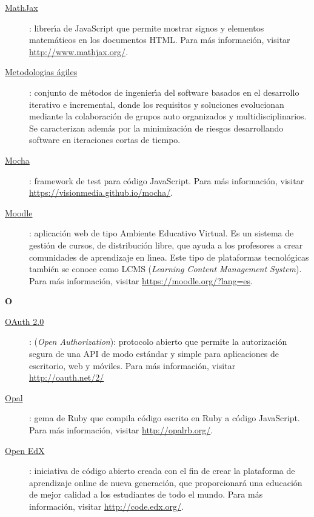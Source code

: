 \begin{description}
  \item[\underline{MathJax}\label{apend1:mathjax}]: librer\'{\i}a de JavaScript que permite mostrar signos y elementos matem\'aticos en los documentos HTML. Para m\'as informaci\'on, 
  visitar {\small \url{http://www.mathjax.org/}}.
  \bigskip

  \item[\underline{Metodologias \'agiles}\label{apend1:ma}]: conjunto de m\'etodos de ingenier\'{\i}a del software basados en el desarrollo iterativo e incremental, donde los requisitos y 
  soluciones evolucionan mediante la colaboraci\'on de grupos auto organizados y multidisciplinarios. Se caracterizan adem\'as por la minimizaci\'on de riesgos desarrollando software en
  iteraciones cortas de tiempo.
  \bigskip

  \item[\underline{Mocha}\label{apend1:mocha}]: framework de test para c\'odigo JavaScript. Para m\'as informaci\'on, visitar {\small \url{https://visionmedia.github.io/mocha/}}.
  \bigskip

  \item[\underline{Moodle}\label{apend1:moodle}]: aplicaci\'on web de tipo Ambiente Educativo Virtual. Es un sistema de gesti\'on de cursos, de distribuci\'on libre, que ayuda a los profesores a 
  crear comunidades de aprendizaje en l\'{\i}nea. Este tipo de plataformas tecnol\'ogicas tambi\'en se conoce como LCMS (\textit{Learning Content Management System}). Para m\'as informaci\'on, 
  visitar {\small \url{https://moodle.org/?lang=es}}.
  \bigskip
\end{description}

\bigskip
{\bfseries {\Huge O}}\label{Apendice1:O}
\bigskip
\bigskip

\begin{description}
  \item[\underline{OAuth 2.0}\label{apend1:oauth}]: (\textit{Open Authorization}): protocolo abierto que permite la autorizaci\'on segura de una API de modo est\'andar y simple para 
  aplicaciones de escritorio, web y m\'oviles. Para m\'as informaci\'on, visitar {\small \url{http://oauth.net/2/}}
  \bigskip

  \item[\underline{Opal}\label{apend1:opal}]: gema de Ruby que compila c\'odigo escrito en Ruby a c\'odigo JavaScript. Para m\'as informaci\'on, visitar {\small \url{http://opalrb.org/}}.
  \bigskip

  \item[\underline{Open EdX}\label{apend1:openedx}]: iniciativa de c\'odigo abierto creada con el fin de crear la plataforma de aprendizaje online de nueva generaci\'on, que proporcionar\'a
  una educaci\'on de mejor calidad a los estudiantes de todo el mundo. Para m\'as informaci\'on, visitar {\small \url{http://code.edx.org/}}.
  \bigskip
\end{description}
\newpage

